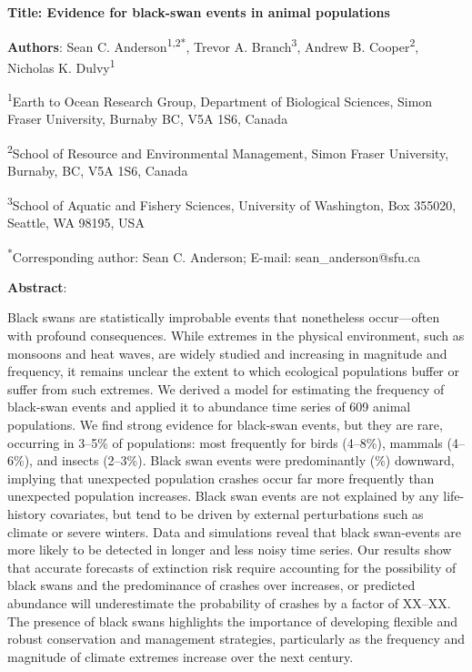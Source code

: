 \textbf{Title: Evidence for black-swan events in animal populations}

\textbf{Authors}: Sean C. Anderson\textsuperscript{1,2*}, Trevor A. Branch\textsuperscript{3}, Andrew B. Cooper\textsuperscript{2}, Nicholas K. Dulvy\textsuperscript{1}

\textsuperscript{1}Earth to Ocean Research Group, Department of Biological Sciences, Simon Fraser University, Burnaby BC, V5A 1S6, Canada

\textsuperscript{2}School of Resource and Environmental Management, Simon Fraser University, Burnaby, BC, V5A 1S6, Canada

\textsuperscript{3}School of Aquatic and Fishery Sciences, University of Washington, Box 355020, Seattle, WA 98195, USA

\textsuperscript{*}Corresponding author: Sean C. Anderson; E-mail: sean\_anderson@sfu.ca

\textbf{Abstract}:

Black swans are statistically improbable events that nonetheless occur---often with profound consequences\cite{taleb2007, sornette2009}. While extremes in the physical environment, such as monsoons and heat waves, are widely studied and increasing in magnitude and frequency\cite{meehl2004, katz2005, ipcc2012}, it remains unclear the extent to which ecological populations buffer or suffer from such extremes. We derived a model for estimating the frequency of black-swan events and applied it to abundance time series of 609 animal populations. We find strong evidence for black-swan events, but they are rare, occurring in 3--5\% of populations: most frequently for birds (4--8\%), mammals (4--6\%), and insects (2--3\%). Black swan events were predominantly (\percBSDown \%) downward, implying that unexpected population crashes occur far more frequently than unexpected population increases. Black swan events are not explained by any life-history covariates, but tend to be driven by external perturbations such as climate or severe winters. Data and simulations reveal that black swan-events are more likely to be detected in longer and less noisy time series. Our results show that accurate forecasts of extinction risk require accounting for the possibility of black swans and the predominance of crashes over increases, or predicted abundance will underestimate the probability of crashes by a factor of XX--XX. The presence of black swans highlights the importance of developing flexible and robust conservation and management strategies, particularly as the frequency and magnitude of climate extremes increase over the next century.

